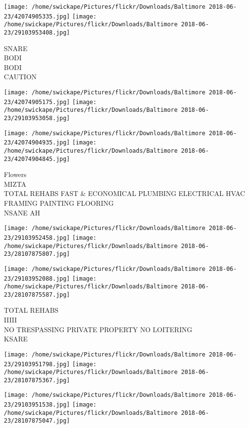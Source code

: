 \documentclass[10pt,letterpaper]{article}
\begin{document}
\texttt{[image: /home/swickape/Pictures/flickr/Downloads/Baltimore 2018-06-23/42074905335.jpg]}
\texttt{[image: /home/swickape/Pictures/flickr/Downloads/Baltimore 2018-06-23/29103953408.jpg]}

SNARE\\
BODI\\
BODI\\
CAUTION\\
\pagebreak

\texttt{[image: /home/swickape/Pictures/flickr/Downloads/Baltimore 2018-06-23/42074905175.jpg]}
\texttt{[image: /home/swickape/Pictures/flickr/Downloads/Baltimore 2018-06-23/29103953058.jpg]}

\texttt{[image: /home/swickape/Pictures/flickr/Downloads/Baltimore 2018-06-23/42074904935.jpg]}
\texttt{[image: /home/swickape/Pictures/flickr/Downloads/Baltimore 2018-06-23/42074904845.jpg]}

Flowers\\
MIZTA\\
TOTAL REHABS FAST \& ECONOMICAL PLUMBING ELECTRICAL HVAC FRAMING PAINTING FLOORING\\
NSANE AH\\
\pagebreak

\texttt{[image: /home/swickape/Pictures/flickr/Downloads/Baltimore 2018-06-23/29103952458.jpg]}
\texttt{[image: /home/swickape/Pictures/flickr/Downloads/Baltimore 2018-06-23/28107875807.jpg]}

\texttt{[image: /home/swickape/Pictures/flickr/Downloads/Baltimore 2018-06-23/29103952088.jpg]}
\texttt{[image: /home/swickape/Pictures/flickr/Downloads/Baltimore 2018-06-23/28107875587.jpg]}

TOTAL REHABS\\
IIIII\\
NO TRESPASSING PRIVATE PROPERTY NO LOITERING\\
KSARE\\
\pagebreak

\texttt{[image: /home/swickape/Pictures/flickr/Downloads/Baltimore 2018-06-23/29103951798.jpg]}
\texttt{[image: /home/swickape/Pictures/flickr/Downloads/Baltimore 2018-06-23/28107875367.jpg]}

\texttt{[image: /home/swickape/Pictures/flickr/Downloads/Baltimore 2018-06-23/29103951538.jpg]}
\texttt{[image: /home/swickape/Pictures/flickr/Downloads/Baltimore 2018-06-23/28107875047.jpg]}
\end{document}
